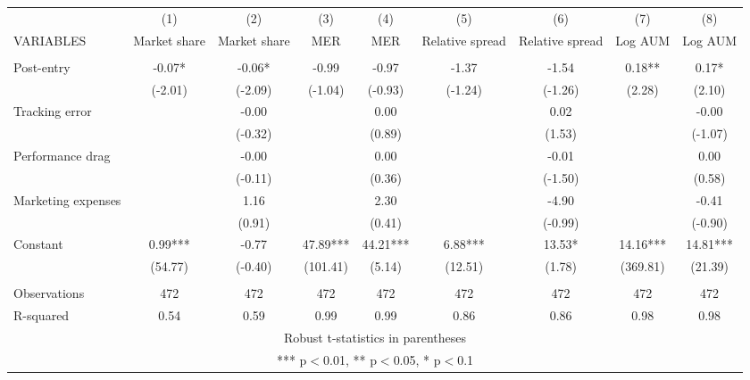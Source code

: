 \documentclass[]{article}
\begin{document}
\begin{tabular}{lcccccccc} \hline
 & (1) & (2) & (3) & (4) & (5) & (6) & (7) & (8) \\
VARIABLES & Market share & Market share & MER & MER & Relative spread & Relative spread & Log AUM & Log AUM \\ \hline
 &  &  &  &  &  &  &  &  \\
Post-entry & -0.07* & -0.06* & -0.99 & -0.97 & -1.37 & -1.54 & 0.18** & 0.17* \\
 & (-2.01) & (-2.09) & (-1.04) & (-0.93) & (-1.24) & (-1.26) & (2.28) & (2.10) \\
Tracking error &  & -0.00 &  & 0.00 &  & 0.02 &  & -0.00 \\
 &  & (-0.32) &  & (0.89) &  & (1.53) &  & (-1.07) \\
Performance drag &  & -0.00 &  & 0.00 &  & -0.01 &  & 0.00 \\
 &  & (-0.11) &  & (0.36) &  & (-1.50) &  & (0.58) \\
Marketing expenses &  & 1.16 &  & 2.30 &  & -4.90 &  & -0.41 \\
 &  & (0.91) &  & (0.41) &  & (-0.99) &  & (-0.90) \\
Constant & 0.99*** & -0.77 & 47.89*** & 44.21*** & 6.88*** & 13.53* & 14.16*** & 14.81*** \\
 & (54.77) & (-0.40) & (101.41) & (5.14) & (12.51) & (1.78) & (369.81) & (21.39) \\
 &  &  &  &  &  &  &  &  \\
Observations & 472 & 472 & 472 & 472 & 472 & 472 & 472 & 472 \\
 R-squared & 0.54 & 0.59 & 0.99 & 0.99 & 0.86 & 0.86 & 0.98 & 0.98 \\ \hline
\multicolumn{9}{c}{ Robust t-statistics in parentheses} \\
\multicolumn{9}{c}{ *** p$<$0.01, ** p$<$0.05, * p$<$0.1} \\
\end{tabular}
\end{document}
